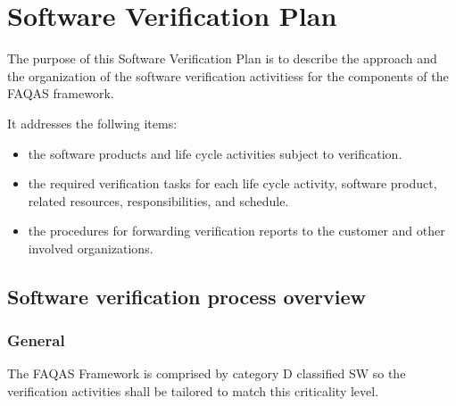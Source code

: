 \chapter{Software Verification Plan}





The purpose of this Software Verification Plan is to describe the approach and the organization of the software verification activitiess for the components of the FAQAS framework.

It addresses the follwing items:
\begin{itemize}
  \item the software products and life cycle activities
  subject to verification.
  \item the required verification tasks for each life cycle activity, software product, related resources, responsibilities, and schedule.
  \item the procedures for forwarding verification reports to the customer and other involved organizations.
\end{itemize}

\section{Software verification process overview}

\subsection{General}

The FAQAS Framework is comprised by category D classified SW so the verification activities shall be tailored to match this criticality level.

